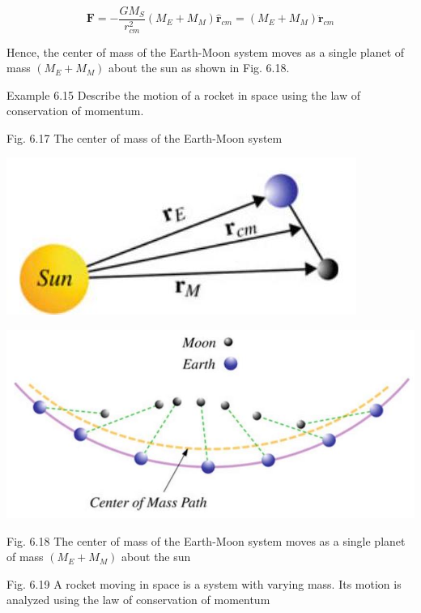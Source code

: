 \documentclass[10pt]{article}
\begin{document}
$$
\mathbf{F}=-\frac{G M_{S}}{r_{c m}^{2}}\left(M_{E}+M_{M}\right) \hat{\mathbf{r}}_{c m}=\left(M_{E}+M_{M}\right) \ddot{\mathbf{r}}_{c m}
$$

Hence, the center of mass of the Earth-Moon system moves as a single planet of mass $\left(M_{E}+M_{M}\right)$ about the sun as shown in Fig. 6.18.

Example 6.15 Describe the motion of a rocket in space using the law of conservation of momentum.

Fig. 6.17 The center of mass of the Earth-Moon system

\begin{center}
\includegraphics[max width=\textwidth]{2024_09_13_db1f357d2aad0a03eb2eg-107(1)}
\end{center}

\begin{center}
\includegraphics[max width=\textwidth]{2024_09_13_db1f357d2aad0a03eb2eg-108(1)}
\end{center}

Fig. 6.18 The center of mass of the Earth-Moon system moves as a single planet of mass $\left(M_{E}+M_{M}\right)$ about the sun

Fig. 6.19 A rocket moving in space is a system with varying mass. Its motion is analyzed using the law of conservation of momentum
\end{document}
